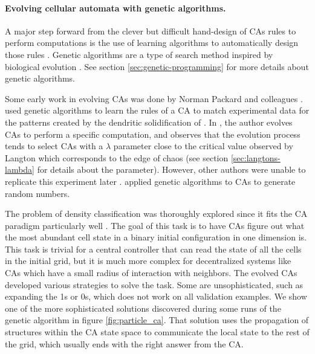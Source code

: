 \paragraph{Evolving cellular automata with genetic algorithms.}
A major step forward from the clever but difficult hand-design of \acp{CA} rules
to perform computations is the use of learning algorithms to automatically
design those rules \parencite{mitchellEvolvingCellularAutomata1996}. Genetic
algorithms are a type of search method inspired by biological evolution
\parencite{bookerClassifierSystemsGenetic1989}. See section
\ref{sec:genetic-programming} for more details about genetic algorithms.

Some early work in evolving \acp{CA} was done by Norman Packard and colleagues
\parencite{packardAdaptationEdgeChaos1988,
  richardsExtractingCellularAutomaton1990}.
\textcite{richardsExtractingCellularAutomaton1990} used genetic algorithms to
learn the rules of a \ac{CA} to match experimental data for the patterns created
by the dendritic solidification of . In
\parencite{packardAdaptationEdgeChaos1988}, the author evolves \acp{CA} to
perform a specific computation, and observes that the evolution process tends to
select \acp{CA} with a $\lambda$ parameter close to the critical value observed by
Langton which corresponds to the edge of chaos (see section
\ref{sec:langtons-lambda} for details about the parameter). However, other
authors were unable to replicate this experiment later
\parencite{mitchellRevisitingEdgeChaos1993}.
\textcite{kozaEvolutionSubsumptionUsing1992} applied genetic algorithms to
\acp{CA} to generate random numbers.

The problem of density classification was thoroughly explored since it fits the
\ac{CA} paradigm particularly well \parencite{mitchellRevisitingEdgeChaos1993,
  mitchellEvolvingCellularAutomata1994,
  crutchfieldEvolutionEmergentComputation1995, dasGeneticAlgorithmDiscovers1994,
  sipperCoevolvingNonuniformCellular1996, andreDiscoveryGeneticProgramming1996}.
The goal of this task is to have \acp{CA} figure out what the most abundant cell
state in a binary initial configuration in one dimension is. This task is trivial
for a central controller that can read the state of all the cells in the initial
grid, but it is much more complex for decentralized systems like \acp{CA}
which have a small radius of interaction with neighbors. The evolved \acp{CA}
developed various strategies to solve the task. Some are unsophisticated, such
as expanding the 1s or 0s, which does not work on all validation examples. We
show one of the more sophisticated solutions discovered during some runs of the
genetic algorithm in figure \ref{fig:particle_ca}. That solution uses the
propagation of structures within the \ac{CA} state space to communicate the
local state to the rest of the grid, which usually ends with the right answer
from the \ac{CA}.

